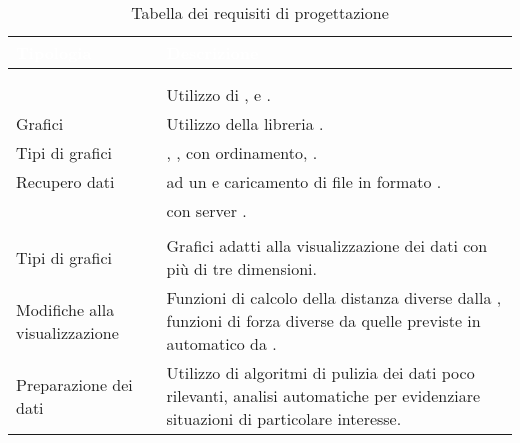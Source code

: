 \renewcommand{\arraystretch}{1.5}
\begin{longtable}{C{4cm} | C{11.5cm}}
		\textcolor{white}{\textbf{Tipologia}} & 
		\textcolor{white}{\textbf{Descrizione}} \\
		\endfirsthead
	    \\
	    \endfoot
	    \caption{Tabella dei requisiti di progettazione}
	    \endlastfoot

\\	    
	    
 & Utilizzo di ,  e . \\

Grafici & Utilizzo della libreria . \\

Tipi di grafici & 
, ,  \newline con ordinamento, .
\\

Recupero dati &  ad un  e caricamento di file in formato . \\

 &   con server . \\
	    
\\	

Tipi di grafici & Grafici adatti alla visualizzazione dei dati con più di tre dimensioni. \\

Modifiche alla visualizzazione & Funzioni di calcolo della distanza diverse dalla , funzioni di forza diverse da quelle previste in automatico da . \\

Preparazione dei dati & Utilizzo di algoritmi di pulizia dei dati poco rilevanti, analisi automatiche per evidenziare situazioni di particolare interesse. \\

\end{longtable}



